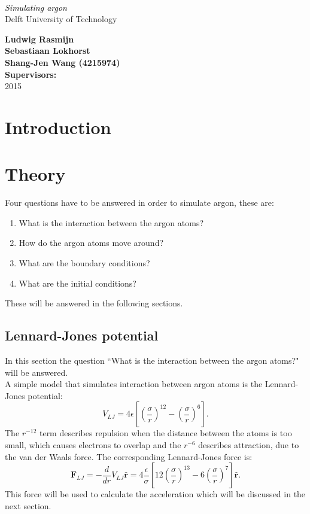 \documentclass[12pt,a4paper]{report}
\newcommand*{\rotrt}[1]{\rotatebox{90}{#1}} %
\newcommand*{\rotlft}[1]{\rotatebox{-90}{#1}} %
\newcommand*{\titleBC}{\begingroup %
\centering %

\def\CP{\textit{\Large Simulating argon }} %

\settowidth{\unitlength}{\CP} %
{\color{CadetBlue}\resizebox*{\unitlength}{\baselineskip}{\rotrt{$\}$}}} \\[\baselineskip] %
\textcolor{Black}{\CP} \\[\baselineskip] %
{\color{Grey}\large Delft University of Technology} \\ %
{\color{CadetBlue}\resizebox*{\unitlength}{\baselineskip}{\rotlft{$\}$}}} %

\vfill %

{\large\textbf{Ludwig Rasmijn}}\\
{\large\textbf{Sebastiaan Lokhorst }}\\
{\large\textbf{Shang-Jen Wang (4215974)}}\\
\bigskip
{\large\textbf{Supervisors:}}\\
{\large\textbf{ }}
\vfill %
\pagestyle{empty}
2015 %

\endgroup}
\begin{document}
\pagestyle{empty}
\titleBC
\newpage
\begin{abstract}
\noindent

\end{abstract}

\newpage
\tableofcontents

\newpage
\pagestyle{fancy}
\fancyhead{}
\fancyfoot{}
\renewcommand{\headrulewidth}{0pt}
\fancyfoot[C]{\thepage}
\listoffigures

\chapter{Introduction}

\chapter{Theory}
Four questions have to be answered in order to simulate argon, these are:
\begin{enumerate}
 \item What is the interaction between the argon atoms?
 \item How do the argon atoms move around?
 \item What are the boundary conditions?
 \item What are the initial conditions?
\end{enumerate}
These will be answered in the following sections.
\section{Lennard-Jones potential}
In this section the question ``What is the interaction between the argon atoms?" will be answered.\\
A simple model that simulates interaction between argon atoms is the Lennard-Jones potential:
\begin{equation}\label{eq:lennardjones}
V_{LJ}=4\epsilon \left[ \left( \frac{\sigma}{r} \right)^{12} - \left( \frac{\sigma}{r} \right)^{6} \right]\text{.}
\end{equation}
The $r^{-12}$ term describes repulsion when the distance between the atoms is too small, which causes electrons to overlap and the $r^{-6}$ describes attraction, due to the van der Waals force. The corresponding Lennard-Jones force is:
\begin{equation}\label{eq:lennardjonesforce}
\boldsymbol{F}_{LJ}=-\frac{d}{dr}V_{LJ}\hat{\boldsymbol{r}}=4\frac{\epsilon}{\sigma} \left[ 12\left( \frac{\sigma}{r} \right)^{13} - 6\left( \frac{\sigma}{r} \right)^{7} \right]\hat{\boldsymbol{r}}\text{.}
\end{equation}
This force will be used to calculate the acceleration which will be discussed in the next section.
\end{document}

